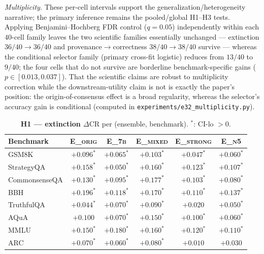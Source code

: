 \emph{Multiplicity.} These per-cell intervals support the generalization/heterogeneity narrative; the primary
inference remains the pooled/global H1--H3 tests. Applying Benjamini--Hochberg FDR control ($q=0.05$)
independently within each $40$-cell family leaves the two scientific families essentially unchanged ---
extinction $36/40\!\to\!36/40$ and provenance$\to$correctness $38/40\!\to\!38/40$ survive --- whereas the
conditional selector family (primary cross-fit logistic) reduces from $13/40$ to $9/40$; the four cells that
do not survive are borderline benchmark-specific gains ($p\in[0.013,0.037]$). That the scientific claims are
robust to multiplicity correction while the downstream-utility claim is not is exactly the paper's position:
the origin-of-consensus effect is a broad regularity, whereas the selector's accuracy gain is conditional
(computed in \texttt{experiments/e32\_multiplicity.py}).

\begin{table}[h]
\centering\small
\caption{\textbf{H1 --- extinction $\Delta\mathrm{CR}$} per (ensemble, benchmark). $^{*}$: CI-lo $>0$.}
\label{tab:grid_h1}
\begin{tabular}{lccccc}
\toprule
Benchmark & \textsc{E\_orig} & \textsc{E\_7b} & \textsc{E\_mixed} & \textsc{E\_strong} & \textsc{E\_n5} \\
\midrule
GSM8K         & $+0.096^{*}$ & $+0.065^{*}$ & $+0.103^{*}$ & $+0.047^{*}$ & $+0.060^{*}$ \\
StrategyQA    & $+0.158^{*}$ & $+0.050^{*}$ & $+0.160^{*}$ & $+0.123^{*}$ & $+0.107^{*}$ \\
CommonsenseQA & $+0.130^{*}$ & $+0.095^{*}$ & $+0.177^{*}$ & $+0.103^{*}$ & $+0.080^{*}$ \\
BBH           & $+0.196^{*}$ & $+0.118^{*}$ & $+0.170^{*}$ & $+0.110^{*}$ & $+0.137^{*}$ \\
TruthfulQA    & $+0.044^{*}$ & $+0.070^{*}$ & $+0.090^{*}$ & $+0.020$ & $+0.050^{*}$ \\
AQuA          & $+0.100$ & $+0.070^{*}$ & $+0.150^{*}$ & $+0.100^{*}$ & $+0.060^{*}$ \\
MMLU          & $+0.150^{*}$ & $+0.180^{*}$ & $+0.160^{*}$ & $+0.120^{*}$ & $+0.110^{*}$ \\
ARC           & $+0.070^{*}$ & $+0.060^{*}$ & $+0.080^{*}$ & $+0.010$ & $+0.030$ \\
\bottomrule
\end{tabular}
\end{table}

